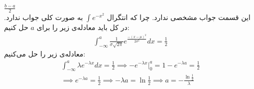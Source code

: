 \\
 $\frac{b - a}{2}$\\
 این قسمت جواب مشخصی ندارد.
چرا که انتگرال
$\int e ^ {-x^2}$
به صورت کلی جواب ندارد. در کل باید معادله‌ی زیر را برای $a$ حل کنیم:
\begin{gather*}
    \int_{-\infty}^{a} \frac{1}{\sigma \sqrt{2\pi}} e^{\frac{-(x - \mu)^2}{2\sigma^2}} dx = \frac{1}{2}
\end{gather*}
 معادله‌ی زیر را حل می‌کنیم:
\begin{gather*}
    \int_{-\infty}^{a} \lambda e^{-\lambda x} dx = \frac{1}{2}
    \implies -e^{-\lambda x} \big |_{0}^{a} = 1 - e^{-\lambda a} = \frac{1}{2}\\
    \implies e^{-\lambda a} = \frac{1}{2} \implies -\lambda a = \ln \frac{1}{2} \implies a = -\frac{\ln \frac{1}{2}}{\lambda}
\end{gather*}